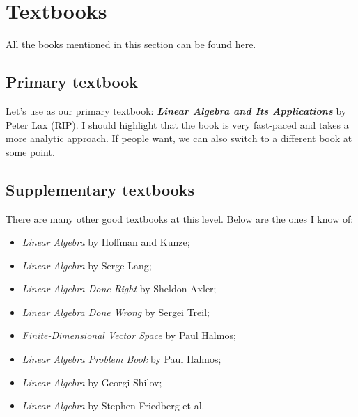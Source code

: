 \documentclass{article}
\begin{document}
\section{Textbooks}
All the books mentioned in this section can be found \href{https://drive.google.com/drive/folders/1chb49hv65hB8ZXcne0Ljfh3viO_SdOmW?usp=drive_link}{here}.

\subsection{Primary textbook}
Let's use as our primary textbook: \textbf{\emph{Linear Algebra and Its Applications}} by Peter Lax (RIP). I should highlight that the book is very fast-paced and takes a more analytic approach. If people want, we can also switch to a different book at some point.

\subsection{Supplementary textbooks}
There are many other good textbooks at this level. Below are the ones I know of:
\begin{itemize}
    \item \textit{Linear Algebra} by Hoffman and Kunze;
    \item \textit{Linear Algebra} by Serge Lang;
    \item \textit{Linear Algebra Done Right} by Sheldon Axler;
    \item \textit{Linear Algebra Done Wrong} by Sergei Treil;
    \item \textit{Finite-Dimensional Vector Space} by Paul Halmos;
    \item \textit{Linear Algebra Problem Book} by Paul Halmos;
    \item \textit{Linear Algebra} by Georgi Shilov;
    \item \textit{Linear Algebra} by Stephen Friedberg et al.
\end{itemize}
\end{document}
